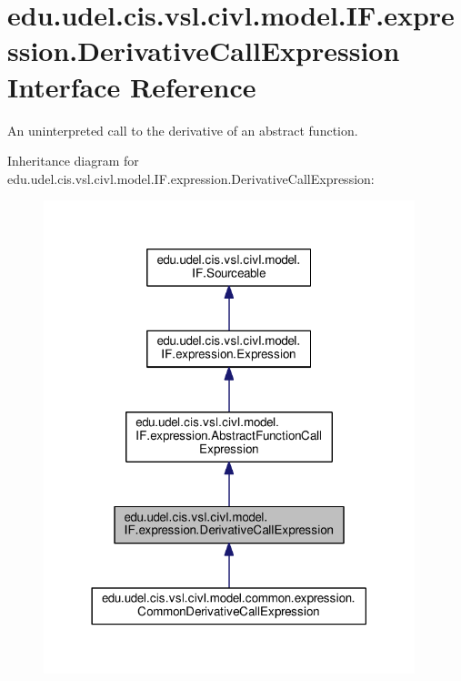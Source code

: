 \hypertarget{interfaceedu_1_1udel_1_1cis_1_1vsl_1_1civl_1_1model_1_1IF_1_1expression_1_1DerivativeCallExpression}{}\section{edu.\+udel.\+cis.\+vsl.\+civl.\+model.\+I\+F.\+expression.\+Derivative\+Call\+Expression Interface Reference}
\label{interfaceedu_1_1udel_1_1cis_1_1vsl_1_1civl_1_1model_1_1IF_1_1expression_1_1DerivativeCallExpression}


An uninterpreted call to the derivative of an abstract function.  




Inheritance diagram for edu.\+udel.\+cis.\+vsl.\+civl.\+model.\+I\+F.\+expression.\+Derivative\+Call\+Expression\+:
\nopagebreak
\begin{figure}[H]
\begin{center}
\leavevmode
\includegraphics[width=306pt]{interfaceedu_1_1udel_1_1cis_1_1vsl_1_1civl_1_1model_1_1IF_1_1expression_1_1DerivativeCallExpression__inherit__graph}
\end{center}
\end{figure}


